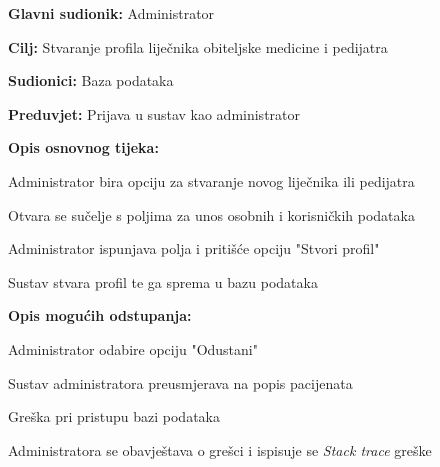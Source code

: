 					\noindent {}
					\begin{packed_item}
						
						\item \textbf{Glavni sudionik: }Administrator
						\item  \textbf{Cilj:} Stvaranje profila liječnika obiteljske medicine i pedijatra
						\item  \textbf{Sudionici:} Baza podataka
						\item  \textbf{Preduvjet:} Prijava u sustav kao administrator
						\item  \textbf{Opis osnovnog tijeka:}
						
						\item[] \begin{packed_enum}
							\item Administrator bira opciju za stvaranje novog liječnika ili pedijatra
							\item Otvara se sučelje s poljima za unos osobnih i korisničkih podataka
							\item Administrator ispunjava polja i pritišće opciju "Stvori profil"
							\item Sustav stvara profil te ga sprema u bazu podataka
						\end{packed_enum}
						\item \textbf{Opis mogućih odstupanja:}
						\item[] \begin{packed_item}
							\item[3.a] Administrator odabire opciju "Odustani"
							\item[] \begin{packed_enum}
								\item Sustav administratora preusmjerava na popis pacijenata
							\end{packed_enum}
							\item[4.a] Greška pri pristupu bazi podataka
							\item[] \begin{packed_enum}
								
								\item Administratora se obavještava o grešci i ispisuje se \textit{Stack trace} greške
								
							\end{packed_enum}
						\end{packed_item}
					\end{packed_item}
					
